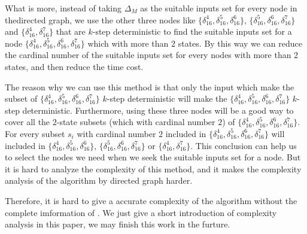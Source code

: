 What is more, instead of taking $\Delta_M$ as the suitable inputs set for every node in thedirected graph, we use the other three nodes like $\{\delta_{16}^4,\delta_{16}^5,\delta_{16}^6\}$, $\{\delta_{16}^5,\delta_{16}^6,\delta_{16}^7\}$ and $\{\delta_{16}^4,\delta_{16}^7\}$ that are $k$-step deterministic to find the suitable inputs set for a node $\{\delta_{16}^4,\delta_{16}^5,\delta_{16}^6,\delta_{16}^7\}$ which with more than $2$ states. By this way we can  reduce the cardinal number of the suitable inputs set for every nodes with more than 2 states, and then reduce the time cost. 

The reason why we can use this method is that only the input which make the subset of $\{\delta_{16}^4,\delta_{16}^5,\delta_{16}^6,\delta_{16}^7\}$ $k$-step deterministic will make the $\{\delta_{16}^4,\delta_{16}^5,\delta_{16}^6,\delta_{16}^7\}$ $k$-step deterministic. Furthermore, using these three nodes will be a good way to cover all the 2-state subsets (which with cardinal number $2$) of $\{\delta_{16}^4,\delta_{16}^5,\delta_{16}^6,\delta_{16}^7\}$. For every subset $s_i$ with cardinal number $2$ included in $\{\delta_{16}^4,\delta_{16}^5,\delta_{16}^6,\delta_{16}^7\}$ will included in $\{\delta_{16}^4,\delta_{16}^5,\delta_{16}^6\}$, $\{\delta_{16}^5,\delta_{16}^6,\delta_{16}^7\}$ or $\{\delta_{16}^4,\delta_{16}^7\}$. This conclusion can help us to select the nodes we need when we seek the suitable inputs set for a node. But it is hard to analyze the complexity of this method, and it makes the complexity analysis of the algorithm by directed graph harder.

Therefore, it is hard to give a accurate complexity of the algorithm without the complete imformation of \BCNs. We just give a short introduction of complexity analysis in this paper, we may finish this work in the furture.
